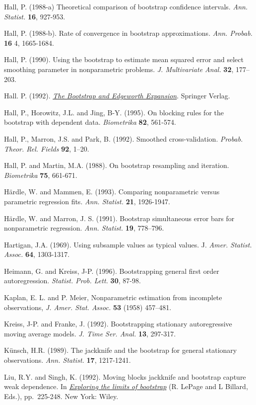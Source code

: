 \documentclass[]{book}
\theoremstyle{definition}
\theoremstyle{definition}
\theoremstyle{definition}
\theoremstyle{remark}
\begin{document}
Hall, P. (1988-a) Theoretical comparison of bootstrap confidence
intervals. \emph{Ann. Statist.} \textbf{16}, 927-953.

Hall, P. (1988-b). Rate of convergence in bootstrap approximations.
\emph{Ann. Probab.} \textbf{16} 4, 1665-1684.

Hall, P. (1990). Using the bootstrap to estimate mean squared error and
select smoothing parameter in nonparametric problems. \emph{J.
Multivariate Anal.} \textbf{32}, 177--203.

Hall. P. (1992).
\href{https://books.google.es/books?hl=es\&lr=\&id=CwLaBwAAQBAJ\&oi=fnd\&pg=PR11\&dq=The+Bootstrap+and+Edgeworth+Expansion}{\emph{The
Bootstrap and Edgeworth Expansion}}. Springer Verlag.

Hall, P., Horowitz, J.L. and Jing, B-Y. (1995). On blocking rules for
the bootstrap with dependent data. \emph{Biometrika} \textbf{82},
561-574.

Hall, P., Marron, J.S. and Park, B. (1992). Smoothed cross-validation.
\emph{Probab. Theor. Rel. Fields} \textbf{92}, 1--20.

Hall, P. and Martin, M.A. (1988). On bootstrap resampling and iteration.
\emph{Biometrika} \textbf{75}, 661-671.

Härdle, W. and Mammen, E. (1993). Comparing nonparametric versus
parametric regression fits. \emph{Ann. Statist.} \textbf{21}, 1926-1947.

Härdle, W. and Marron, J. S. (1991). Bootstrap simultaneous error bars
for nonparametric regression. \emph{Ann. Statist.} \textbf{19},
778--796.

Hartigan, J.A. (1969). Using subsample values as typical values. J.
\emph{Amer. Statist. Assoc.} \textbf{64}, 1303-1317.

Heimann, G. and Kreiss, J-P. (1996). Bootstrapping general first order
autoregression. \emph{Statist. Prob. Lett.} \textbf{30}, 87-98.

Kaplan, E. L. and P. Meier, Nonparametric estimation from incomplete
observations, \emph{J. Amer. Stat. Assoc.} \textbf{53} (1958) 457--481.

Kreiss, J-P. and Franke, J. (1992). Bootstrapping stationary
autoregressive moving average models. \emph{J. Time Ser. Anal.}
\textbf{13}, 297-317.

Künsch, H.R. (1989). The jackknife and the bootstrap for general
stationary observations. \emph{Ann. Statist.} \textbf{17}, 1217-1241.

Liu, R.Y. and Singh, K. (1992). Moving blocks jackknife and bootstrap
capture weak dependence. In
\href{https://books.google.es/books?hl=es\&lr=\&id=ZJzIpNZNVLgC\&oi=fnd\&pg=PA3\&dq=Exploring+the+limits+of+the+bootstrap}{\emph{Exploring
the limits of bootstrap}} (R. LePage and L Billard, Eds.), pp.~225-248.
New York: Wiley.
\end{document}
